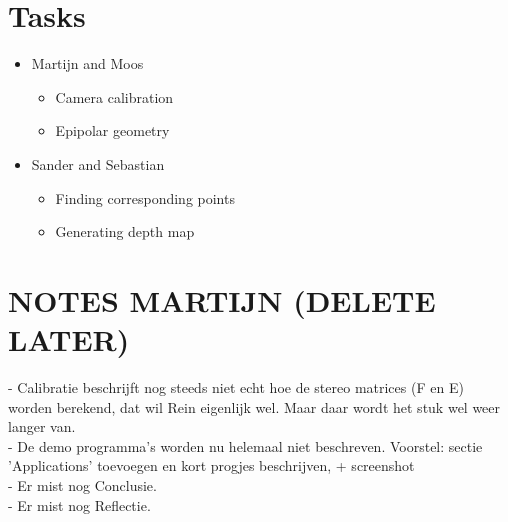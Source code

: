 \documentclass[a4paper]{article}
\begin{document}
\section{Tasks}
  \begin{itemize}
    \item Martijn and Moos
    \begin{itemize}
      \item Camera calibration
      \item Epipolar geometry
    \end{itemize}
    \item Sander and Sebastian
    \begin{itemize}
      \item Finding corresponding points
      \item Generating depth map
    \end{itemize}
  \end{itemize}



\section{NOTES MARTIJN (DELETE LATER)}

 - Calibratie beschrijft nog steeds niet echt hoe de stereo matrices (F en E)
   worden berekend, dat wil Rein eigenlijk wel. Maar daar wordt het stuk wel
   weer langer van. \\
 - De demo programma's worden nu helemaal niet beschreven. Voorstel: sectie
   'Applications' toevoegen en kort progjes beschrijven, + screenshot \\
 - Er mist nog Conclusie. \\
 - Er mist nog Reflectie. \\


 
\end{document}
